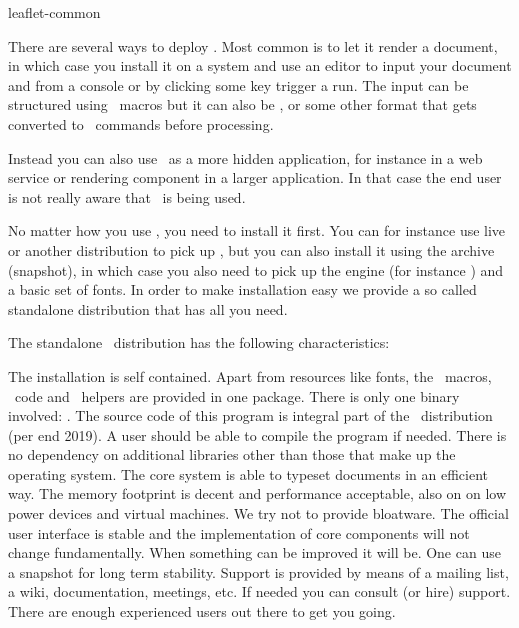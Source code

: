\environment leaflet-common

\startdocument[graphic=1]

\startbuffer[1]
    There are several ways to deploy \CONTEXT. Most common is to let it render a
    document, in which case you install it on a system and use an editor to input
    your document and from a console or by clicking some key trigger a run. The
    input can be structured using \TEX\ macros but it can also be \XML, or some
    other format that gets converted to \CONTEXT\ commands before processing.
\stopbuffer

\startbuffer[2]
    Instead you can also use \CONTEXT\ as a more hidden application, for instance
    in a web service or rendering component in a larger application. In that case
    the end user is not really aware that \TEX\ is being used.
\stopbuffer

\startbuffer[3]
    No matter how you use \CONTEXT, you need to install it first. You can for
    instance use \TEX live or another distribution to pick up \CONTEXT, but you
    can also install it using the archive (snapshot), in which case you also need
    to pick up the engine (for instance \LUATEX) and a basic set of fonts. In
    order to make installation easy we provide a so called standalone
    distribution that has all you need.
\stopbuffer

\startbuffer[4]

    The standalone \CONTEXT\ distribution has the following characteristics:

    \startitemize
        \startitem
            The installation is self contained. Apart from resources like fonts,
            the \TEX\ macros, \LUA\ code and \METAPOST\ helpers are provided in
            one package.
        \stopitem
        \startitem
            There is only one binary involved: \LUAMETATEX. The source code of
            this program is integral part of the \CONTEXT\ distribution (per end
            2019). A user should be able to compile the program if needed. There
            is no dependency on additional libraries other than those that make
            up the operating system.
        \stopitem
        \startitem
            The core system is able to typeset documents in an efficient way. The
            memory footprint is decent and performance acceptable, also on on low
            power devices and virtual machines. We try not to provide bloatware.
        \stopitem
        \startitem
            The official user interface is stable and the implementation of core
            components will not change fundamentally. When something can be
            improved it will be. One can use a snapshot for long term stability.
        \stopitem
        \startitem
            Support is provided by means of a mailing list, a wiki,
            documentation, meetings, etc. If needed you can consult (or hire)
            support. There are enough experienced users out there to get you
            going.
        \stopitem
    \stopitemize
\stopbuffer

